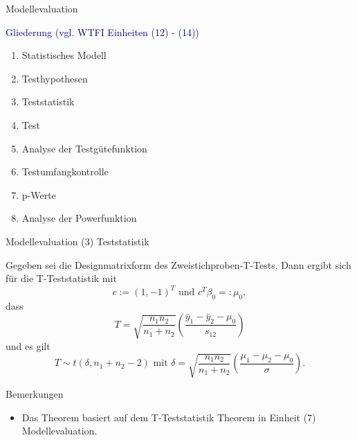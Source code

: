 \documentclass[
  8pt,
  ignorenonframetext,
]{beamer}
\providecommand{\tightlist}{%
  \setlength{\itemsep}{0pt}\setlength{\parskip}{0pt}}
\begin{document}
\begin{frame}{Modellevaluation}
\protect\hypertarget{modellevaluation-25}{}

\textcolor{darkblue}{Gliederung (vgl. WTFI Einheiten (12) - (14))}

\begin{enumerate}
[(1)]
\item
  Statistisches Modell \checkmark
\item
  Testhypothesen \checkmark
\item
  Teststatistik
\item
  Test
\item
  Analyse der Testgütefunktion
\item
  Testumfangkontrolle
\item
  p-Werte
\item
  Analyse der Powerfunktion
\end{enumerate}
\end{frame}

\begin{frame}{Modellevaluation}
\protect\hypertarget{modellevaluation-26}{}
\noindent (3) Teststatistik

\footnotesize
\begin{theorem}
\justifying
\normalfont
Gegeben sei die Designmatrixform des Zweistichproben-T-Tests. Dann ergibt sich
für die T-Teststatistik mit
\begin{equation}
c := (1,-1)^T \mbox{ und } c^T\beta_0 =: \mu_0,
\end{equation}
dass
\begin{equation}
T = \sqrt{\frac{n_1n_2}{n_1+n_2}}\left(\frac{\bar{y}_1-\bar{y}_2 - \mu_0}{s_{12}}\right)
\end{equation}
und es gilt
\begin{equation}
T \sim t(\delta, n_1 + n_2 - 2) \mbox{ mit } \delta = \sqrt{\frac{n_1n_2}{n_1+n_2}}\left(\frac{\mu_1-\mu_2-\mu_0}{\sigma}\right).
\end{equation}
\end{theorem}

Bemerkungen

\begin{itemize}
\tightlist
\item
  Das Theorem basiert auf dem T-Teststatistik Theorem in Einheit (7)
  Modellevaluation.
\end{itemize}
\end{frame}
\end{document}
